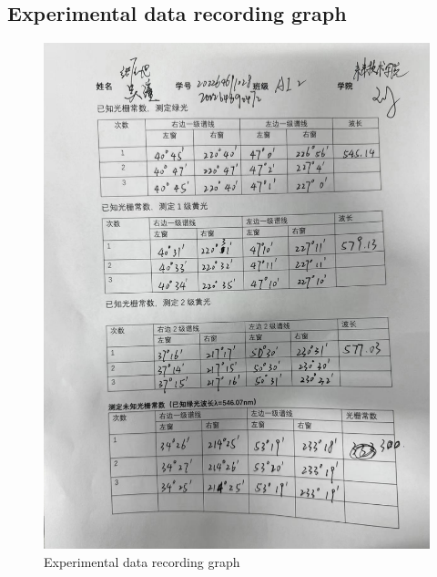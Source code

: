 \documentclass[UTF8]{article}
\begin{document}
\begin{appendix}
 \section{Experimental data recording graph} 
     	\begin{figure}[H]
     	    	\centering
     	    	\includegraphics[clip,scale=0.6,trim={0 0 0 0}]{fig/fig7.png}
     	        \caption{Experimental data recording graph}
     	        \label{figure.19}
         \end{figure} 
 \end{appendix}        
\end{document}
